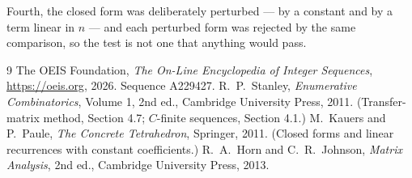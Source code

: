 \documentclass[11pt,a4paper]{article}
\theoremstyle{plain}
\theoremstyle{definition}
\begin{document}
Fourth, the closed form was deliberately perturbed --- by a constant and by a term linear in
$n$ --- and each perturbed form was rejected by the same comparison, so the test is not one
that anything would pass.

\begin{thebibliography}{9}
 The OEIS Foundation, \emph{The On-Line Encyclopedia of Integer
Sequences}, \url{https://oeis.org}, 2026. Sequence A229427.
 R.~P.~Stanley, \emph{Enumerative Combinatorics}, Volume 1, 2nd ed.,
Cambridge University Press, 2011. (Transfer-matrix method, Section 4.7; $C$-finite sequences,
Section 4.1.)
 M.~Kauers and P.~Paule, \emph{The Concrete Tetrahedron}, Springer, 2011.
(Closed forms and linear recurrences with constant coefficients.)
 R.~A.~Horn and C.~R.~Johnson, \emph{Matrix Analysis}, 2nd ed., Cambridge
University Press, 2013.
\end{thebibliography}
\end{document}
